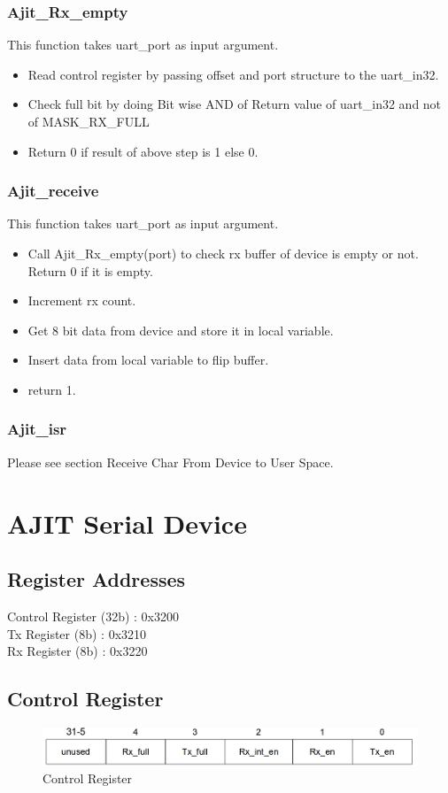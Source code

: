 \documentclass[12pt,a4paper]{article}
\begin{document}
\subsubsection{Ajit\_Rx\_empty}
This function takes uart\_port as input argument.
\begin{itemize}
\item Read control register by passing offset and port structure to the uart\_in32. 
\item Check full bit by doing Bit wise AND of Return value of uart\_in32 and not of MASK\_RX\_FULL
\item Return 0 if result of above step is 1 else 0.
\end{itemize}
\subsubsection{Ajit\_receive}
This function takes uart\_port as input argument.
\begin{itemize}
\item Call Ajit\_Rx\_empty(port) to check rx buffer of device is empty or not. Return 0 if it is empty. 
\item Increment rx count.
\item Get 8 bit data from device and store it in local variable.
\item Insert data from local variable to flip buffer.
\item return 1.
\end{itemize}
\subsubsection{Ajit\_isr}
Please see section Receive Char From Device to User Space.

\newpage
\section{AJIT Serial Device}
\subsection{Register Addresses}
Control Register (32b) : 0x3200\\
Tx Register (8b) : 0x3210\\
Rx Register (8b) : 0x3220
\subsection{Control Register}
	\begin{figure}[h!]
	\centering
	\includegraphics[width=1.0\textwidth]{./figs/serial_con_reg.png}
	\caption{Control Register}
	\label{fig2}
	\end{figure}
\end{document}
